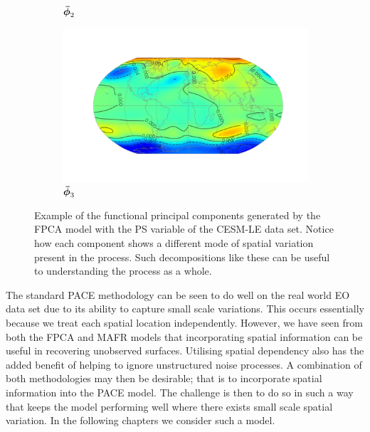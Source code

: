 \begin{figure}
\begin{subfigure}[b]{0.45\textwidth}
		\caption{$\bm{{\bar{\phi}}}_{2}$}
		\label{fig:ftsm_res_PS_fpc_2}
	\end{subfigure}
	\begin{subfigure}[b]{0.45\textwidth}
		\includegraphics[width=\textwidth]{ftsm_res_PS_fpc_2}
		\caption{$\bm{{\bar{\phi}}}_{3}$}
		\label{fig:ftsm_res_PS_fpc_3}
	\end{subfigure}
	\caption[Example of the functional principal components generated by the FPCA model with the PS variable.]{Example of the functional principal components generated by the FPCA model with the PS variable of the CESM-LE data set. Notice how each component shows a different mode of spatial variation present in the process. Such decompositions like these can be useful to understanding the process as a whole.}
	\label{fig:ftsm_res_PS_fpc}
\end{figure}

The standard PACE methodology can be seen to do well on the real world EO data set due to its ability to capture small scale variations.
This occurs essentially because we treat each spatial location independently.
However, we have seen from both the FPCA and MAFR models that incorporating spatial information can be useful in recovering unobserved surfaces.
Utilising spatial dependency also has the added benefit of helping to ignore unstructured noise processes. 
A combination of both methodologies may then be desirable; that is to incorporate spatial information into the PACE model.
The challenge is then to do so in such a way that keeps the model performing well where there exists small scale spatial variation.
In the following chapters we consider such a model. 